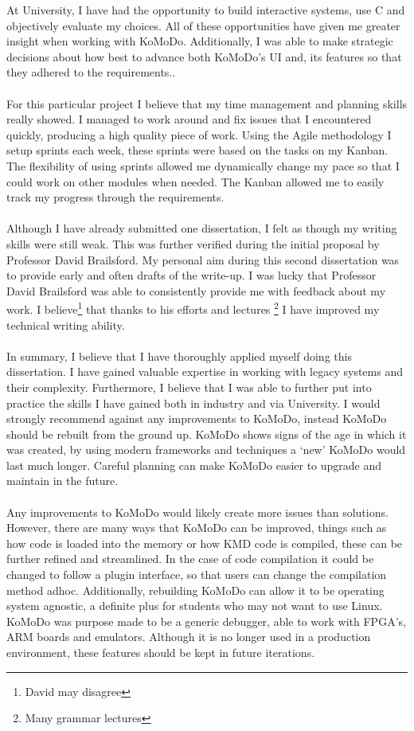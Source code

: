 %
At University, I have had the opportunity to build interactive systems, use C and objectively evaluate my choices. All of these opportunities have given me greater insight when working with KoMoDo. Additionally, I was able to make strategic decisions about how best to advance both KoMoDo's UI and, its features so that they adhered to the requirements..\\\\
%
For this particular project I believe that my time management and planning skills really showed. I managed to work around and fix issues that I encountered quickly, producing a high quality piece of work. Using the Agile methodology I setup sprints each week, these sprints were based on the tasks on my Kanban. The flexibility of using sprints allowed me dynamically change my pace so that I could work on other modules when needed. The Kanban allowed me to easily track my progress through the requirements.\\\\
%
Although I have already submitted one dissertation, I felt as though my writing skills were still weak. This was further verified during the initial proposal by Professor David Brailsford. My personal aim during this second dissertation was to provide early and often drafts of the write-up. I was lucky that Professor David Brailsford was able to consistently provide me with feedback about my work. I believe\footnote{David may disagree} that thanks to his efforts and lectures \footnote{Many grammar lectures} I have improved my technical writing ability.\\\\
%
In summary, I believe that I have thoroughly applied myself doing this dissertation. I have gained valuable expertise in working with legacy systems and their complexity. Furthermore, I believe that I was able to further put into practice the skills I have gained both in industry and via University.
%
%
%
I would strongly recommend against any improvements to KoMoDo, instead KoMoDo should be rebuilt from the ground up. KoMoDo shows signs of the age in which it was created, by using modern frameworks and techniques a `new' KoMoDo would last much longer. Careful planning can make KoMoDo easier to upgrade and maintain in the future.\\\\
%
Any improvements to KoMoDo would likely create more issues than solutions. However, there are many ways that KoMoDo can be improved, things such as how code is loaded into the memory or how KMD code is compiled, these can be further refined and streamlined. In the case of code compilation it could be changed to follow a plugin interface, so that users can change the compilation method adhoc. Additionally, rebuilding KoMoDo can allow it to be operating system agnostic, a definite plus for students who may not want to use Linux. KoMoDo was purpose made to be a generic debugger, able to work with FPGA's, ARM boards and emulators. Although it is no longer used in a production environment, these features should be kept in future iterations.
